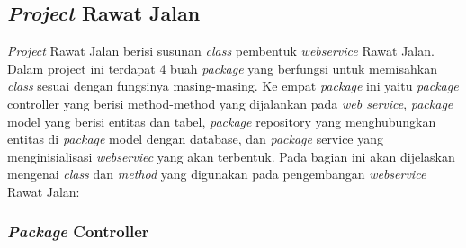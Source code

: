 \subsection{\textit{Project} Rawat Jalan}
\textit{Project} Rawat Jalan berisi susunan \textit{class} pembentuk \textit{webservice} Rawat Jalan. Dalam project ini terdapat 4 buah \textit{package} yang berfungsi untuk memisahkan \textit{class} sesuai dengan fungsinya masing-masing. Ke empat \textit{package} ini yaitu \textit{package} controller yang berisi method-method yang dijalankan pada \textit{web service}, \textit{package} model yang berisi entitas dan tabel, \textit{package} repository yang menghubungkan entitas di \textit{package} model dengan database, dan \textit{package} service yang menginisialisasi \textit{webserviec} yang akan terbentuk. Pada bagian ini akan dijelaskan mengenai \textit{class} dan \textit{method} yang digunakan pada pengembangan \textit{webservice} Rawat Jalan:
\subsubsection{\textit{Package} Controller}

